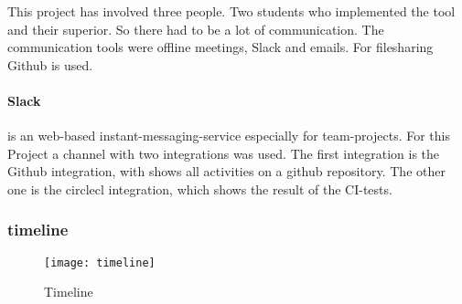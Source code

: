 This project has involved three people. Two students who implemented the tool and their superior. So there had to be a lot of communication. The communication tools were offline meetings, Slack and emails. For filesharing Github is used. 

\paragraph*{Slack} is an web-based instant-messaging-service especially for team-projects. For this Project a channel with two integrations was used. The first integration is the Github integration, with shows all activities on a github repository. The other one is the circlecl integration, which shows the result of the CI-tests. 

\subsubsection*{timeline}
\begin{figure}[!htb]
	\centering
		\texttt{[image: timeline]}
	\caption{Timeline}
	\label{fig:timeline}
\end{figure}



